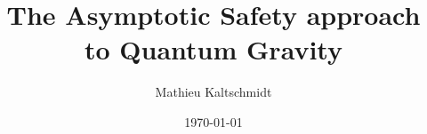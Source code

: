 \title{The Asymptotic Safety approach to Quantum Gravity}
\author{Mathieu Kaltschmidt}
\date{\today}

\newtheorem{statements}{Statements}[chapter]

\usepackage{fancyhdr}
\fancyhfoffset{0pt}

\usepackage[a4paper,
			width = 150mm,
			top = 30mm,
		    bottom=30mm%
		    ]{geometry}
\usepackage[onehalfspacing]{setspace}


\renewcommand{\chaptermark}[1]{
    \markboth{\mbox{\@chapapp}\ \thechapter.\ \ #1}{}%
}
\renewcommand{\sectionmark}[1]{
    \markright{\thesection\ \ #1}{}
}

\renewcommand*\raggedchapter{\centering}
\renewcommand*{\chapterformat}{%
  \chapappifchapterprefix{\nobreakspace}\thechapter\autodot%
  \IfUsePrefixLine{%
    \par\nobreak\vspace{-\parskip}\vspace{-.6\baselineskip}%
    \rule{0.9\textwidth}{0.5pt}\vspace{-1\baselineskip}%
  }{\enskip}%
}
\renewcommand\chapterlineswithprefixformat[3]{%
#2#3
}



\pagestyle{fancy}
	\fancyhf{}
	\fancyhead[LE]{\footnotesize\nouppercase{\leftmark}}
	\fancyhead[RO]{\footnotesize\nouppercase{\rightmark}}
	\fancyfoot[C]{\thepage}
	\renewcommand{\headrulewidth}{0.2pt}
	\renewcommand{\footrulewidth}{0pt}



\usepackage{amsmath, amssymb, commath, mathtools}
\usepackage{physics}
\usepackage[hyperref]{ntheorem}
\usepackage{xfrac}
\usepackage[separate-uncertainty]{siunitx}


\usepackage{array} %
\usepackage{booktabs} %

